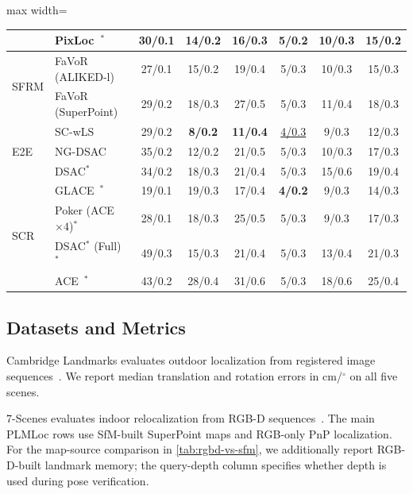 \documentclass[letterpaper,10 pt,conference]{ieeeconf}
\newcommand{\method}{PLMLoc}
\begin{document}
\begin{table}[!t]
\begin{adjustbox}{max width=\textwidth}
\begin{tabular}{@{}llcccccc@{}}
        & PixLoc~\cite{sarlin2021pixloc}$^\ast$ & 30/0.1 & 14/0.2 & 16/0.3 & 5/0.2 & 10/0.3 & 15/0.2 \\
        \midrule
        \multirow{2}{*}{SFRM}
        & FaVoR (ALIKED-l)~\cite{polizzi2025favor} & 27/0.1 & 15/0.2 & 19/0.4 & 5/0.3 & 10/0.3 & 15/0.3 \\
        & FaVoR (SuperPoint)~\cite{polizzi2025favor} & 29/0.2 & 18/0.3 & 27/0.5 & 5/0.3 & 11/0.4 & 18/0.3 \\
        \midrule
        \multirow{3}{*}{E2E}
        & SC-wLS~\cite{wu2022scwls} & 29/0.2 & \textbf{8/0.2} & \textbf{11/0.4} & \underline{4/0.3} & 9/0.3 & 12/0.3 \\
        & NG-DSAC~\cite{brachmann2019ngdsac} & 35/0.2 & 12/0.2 & 21/0.5 & 5/0.3 & 10/0.3 & 17/0.3 \\
        & DSAC$^\ast$~\cite{brachmann2021dsacstar} & 34/0.2 & 18/0.3 & 21/0.4 & 5/0.3 & 15/0.6 & 19/0.4 \\
        \midrule
        \multirow{4}{*}{SCR}
        & GLACE~\cite{wang2024glace}$^\ast$ & 19/0.1 & 19/0.3 & 17/0.4 & \textbf{4/0.2} & 9/0.3 & 14/0.3 \\
        & Poker (ACE~\cite{brachmann2023ace} $\times 4$)$^\ast$ & 28/0.1 & 18/0.3 & 25/0.5 & 5/0.3 & 9/0.3 & 17/0.3 \\
        & DSAC$^\ast$ (Full)~\cite{brachmann2021dsacstar}$^\ast$ & 49/0.3 & 15/0.3 & 21/0.4 & 5/0.3 & 13/0.4 & 21/0.3 \\
        & ACE~\cite{brachmann2023ace}$^\ast$ & 43/0.2 & 28/0.4 & 31/0.6 & 5/0.3 & 18/0.6 & 25/0.4 \\
        \bottomrule
    \end{tabular}
    \end{adjustbox}
\end{table}
\subsection{Datasets and Metrics}

Cambridge Landmarks evaluates outdoor localization from registered image sequences~\cite{kendall2015posenet}. We report median translation and rotation errors in cm/$^\circ$ on all five scenes.

7-Scenes evaluates indoor relocalization from RGB-D sequences~\cite{microsoft7scenes}. The main \method{} rows use SfM-built SuperPoint maps and RGB-only PnP localization. For the map-source comparison in \cref{tab:rgbd-vs-sfm}, we additionally report RGB-D-built landmark memory; the query-depth column specifies whether depth is used during pose verification.
\end{document}
